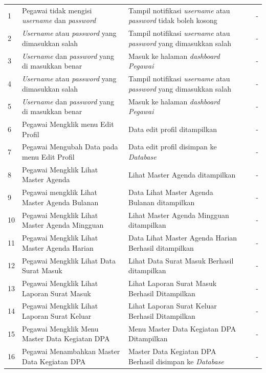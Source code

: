\begin{enumerate}
{\begin{longtable}{p{0.5cm} p{4cm} p{4cm} p{0.5cm} p{1cm}}
			1 & Pegawai tidak mengisi \textit{username} dan \textit{password} & Tampil notifikasi \textit{username} atau \textit{password} tidak boleh kosong & \checkmark & -\\
			2 & \textit{Username} atau \textit{password} yang dimasukkan salah & Tampil notifikasi \textit{username} atau \textit{password} yang dimasukkan salah & \checkmark & -\\
			3 & \textit{Username} dan \textit{password} yang di masukkan benar & Masuk ke halaman \textit{dashboard Pegawai} & \checkmark & -\\
			4 & \textit{Username} atau \textit{password} yang dimasukkan salah & Tampil notifikasi \textit{username} atau \textit{password} yang dimasukkan salah & \checkmark & -\\
			5 & \textit{Username} dan \textit{password} yang di masukkan benar & Masuk ke halaman \textit{dashboard Pegawai} & \checkmark & -\\
			6 & Pegawai Mengklik menu Edit Profil  & Data edit profil ditampilkan & \checkmark & -\\
			7 & Pegawai Mengubah Data pada  menu Edit Profil  & Data edit profil disimpan ke \textit{Database} & \checkmark & -\\
			8 & Pegawai Mengklik Lihat Master Agenda & Lihat Master Agenda ditampilkan & \checkmark & -\\		
			9 & Pegawai mengklik Lihat Master Agenda Bulanan & Data Lihat Master Agenda Bulanan ditampilkan & \checkmark & -\\
			10 & Pegawai Mengklik Lihat Master Agenda Mingguan & Lihat Master Agenda Mingguan ditampilkan  & \checkmark & -\\		
			11 & Pegawai Mengklik Lihat Master Agenda Harian & Data Lihat Master Agenda Harian Berhasil ditampilkan  & \checkmark & -\\
			12 & Pegawai Mengklik Lihat Data Surat Masuk & Lihat Data Surat Masuk Berhasil ditampilkan  & \checkmark & -\\
			13 & Pegawai Mengklik Lihat Laporan  Surat Masuk & Lihat Laporan  Surat Masuk Berhasil Ditampilkan  & \checkmark & -\\
			14 & Pegawai Mengklik Lihat Laporan Surat Keluar & Lihat Laporan Surat Keluar Berhasil Ditampilkan  & \checkmark & -\\
			15 & Pegawai Mengklik Menu Master Data Kegiatan DPA & Menu Master Data Kegiatan DPA Ditampilkan  & \checkmark & -\\
			16 & Pegawai Menambahkan Master Data Kegiatan DPA & Master Data Kegiatan DPA Berhasil disimpan ke \textit{Database}  & \checkmark & -\\

\end{longtable}}
\end{enumerate}
